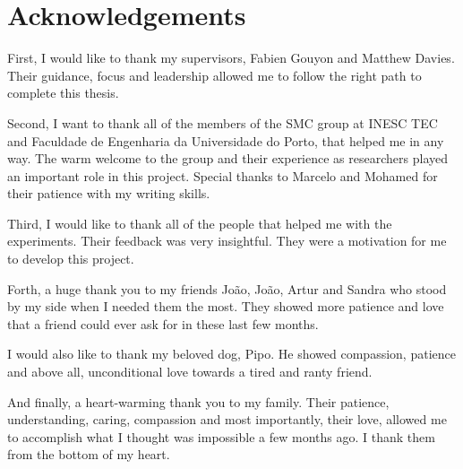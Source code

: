 
\chapter*{Acknowledgements}

First, I would like to thank my supervisors, Fabien Gouyon and Matthew Davies.
Their guidance, focus and leadership allowed me to follow the right path to complete this thesis.

Second, I want to thank all of the members of the SMC group at INESC TEC and Faculdade de Engenharia da Universidade do Porto, that helped me in any way.
The warm welcome to the group and their experience as researchers played an important role in this project.
Special thanks to Marcelo and Mohamed for their patience with my writing skills.

Third, I would like to thank all of the people that helped me with the experiments.
Their feedback was very insightful.
They were a motivation for me to develop this project.

Forth, a huge thank you to my friends João, João, Artur and Sandra who stood by my side when I needed them the most.
They showed more patience and love that a friend could ever ask for in these last few months.

I would also like to thank my beloved dog, Pipo. He showed compassion, patience and above all, unconditional love towards a tired and ranty friend.

And finally, a heart-warming thank you to my family.
Their patience, understanding, caring, compassion and most importantly, their love, allowed me to accomplish what I thought was impossible a few months ago.
I thank them from the bottom of my heart.


\vspace{10mm}
